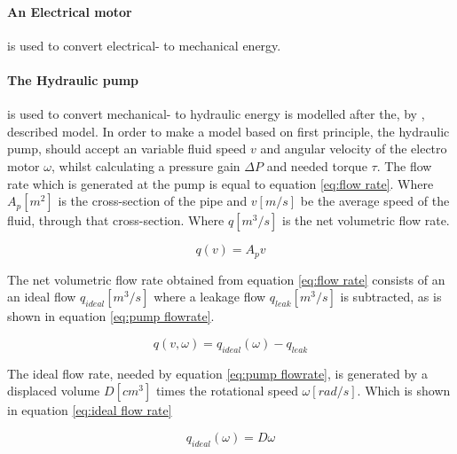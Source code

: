 \paragraph{An Electrical motor} is used to convert electrical- to mechanical energy.

\paragraph{The Hydraulic pump} is used to convert mechanical- to hydraulic energy is modelled after the, by \citet{mathworks_mechanical--hydraulic_2016}, described model. In order to make a model based on first principle, the hydraulic pump, should accept an variable fluid speed $ v $ and angular velocity of the electro motor $ \omega $, whilst calculating a pressure gain $ \Delta P $ and needed torque $ \tau $. The flow rate which is generated at the pump is equal to equation \ref{eq:flow rate}. Where $ A_p [m^2] $ is the cross-section of the pipe and $ v [m/s] $ be the average speed of the fluid, through that cross-section. Where $ q \left[m^3/s\right] $ is the net volumetric flow rate.

\begin{sBox}
	\begin{equation}\label{eq:flow rate}
		q(v) = A_p v
	\end{equation}
\end{sBox}

\noindent The net volumetric flow rate obtained from equation \ref{eq:flow rate} consists of an an ideal flow $ q_{ideal} \left[m^3/s\right]$ where a leakage flow $ q_{leak} \left[m^3/s\right] $ is subtracted, as is shown in equation \ref{eq:pump flowrate}.

\begin{sBox}
	\begin{equation}\label{eq:pump flowrate}
		q(v,\omega) = q_{ideal}(\omega) - q_{leak}
	\end{equation}
\end{sBox}

\noindent The ideal flow rate, needed by equation \ref{eq:pump flowrate}, is generated by a displaced volume $ D [cm^3] $ times the rotational speed $ \omega [rad/s] $. Which is shown in equation \ref{eq:ideal flow rate}
\begin{sBox}
	\begin{equation}\label{eq:ideal flow rate}
	q_{ideal}(\omega) = D \omega
	\end{equation}
\end{sBox}

